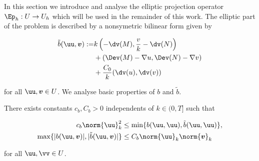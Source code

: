 In this section we introduce and analyse the elliptic projection operator $\Ep_h:U\to U_h$ which will be used in the remainder of this work. The elliptic part of the problem is described by a nonsymetric bilinear form given by

\begin{align*}
    \tilde{b}(\uu,\boldsymbol{v}):=&k\left(-\dv(M),\frac{v}{k}-\dv(N)\right)\\
    &+(\Dev(M)-\nabla u,\Dev(N)-\nabla v)\\
    &+\frac{C_0}{k}(\dv(u),\dv(v))
\end{align*}

for all $\uu,\boldsymbol{v}\in U$. We analyse basic properties of $b$ and $\tilde{b}$.

\begin{lemma}
    There exists constants $c_b,C_b>0$ independents of $k\in(0,T]$ such that 

    \begin{align}
        c_b\norm{\uu}_k^2&\leq\min\{b(\uu,\uu),\tilde{b}(\uu,\uu)\},\label{coercive}\\
        \max\{|b(\uu,\boldsymbol{v})|,|\tilde{b}(\uu,\boldsymbol{v})|\}&\leq C_b\norm{\uu}_k\norm{\boldsymbol{v}}_k\label{bound}
    \end{align}

    for all $\uu,\vv \in U$.
\end{lemma}

